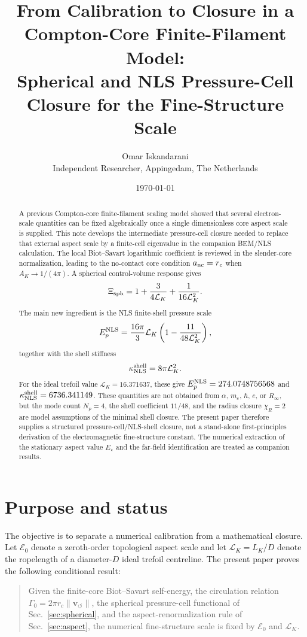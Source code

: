 \documentclass[11pt]{article}
\title{From Calibration to Closure in a Compton-Core Finite-Filament Model:\\
Spherical and NLS Pressure-Cell Closure for the Fine-Structure Scale}
\author{Omar Iskandarani\\
\small Independent Researcher, Appingedam, The Netherlands}
\date{\today}
\newcommand{\vnorm}{\lVert\mathbf{v}_{\!\boldsymbol{\circlearrowleft}}\rVert}
\newcommand{\rc}{r_c}
\newcommand{\LK}{\mathcal L_K}
\newcommand{\Ezero}{\mathcal E_0}
\begin{document}
\maketitle

\begin{abstract}
A previous Compton-core finite-filament scaling model showed that several electron-scale
quantities can be fixed algebraically once a single dimensionless core aspect scale is supplied.
This note develops the intermediate pressure-cell closure needed to replace that external
aspect scale by a finite-cell eigenvalue in the companion BEM/NLS calculation.  The local
Biot--Savart logarithmic coefficient is reviewed in the slender-core normalization, leading to
the no-contact core condition \(a_{\rm nc}=r_c\) when \(A_K\to1/(4\pi)\).  A spherical
control-volume response gives
\[
  \Xi_{\rm sph}
  =
  1+\frac{3}{4\mathcal L_K}+\frac{1}{16\mathcal L_K^2}.
\]
The main new ingredient is the NLS finite-shell pressure scale
\[
  E_p^{\rm NLS}
  =
  \frac{16\pi}{3}\mathcal L_K
  \left(1-\frac{11}{48\mathcal L_K^2}\right),
\]
together with the shell stiffness
\[
  \kappa_{\rm NLS}^{\rm shell}=8\pi\mathcal L_K^2.
\]
For the ideal trefoil value \(\mathcal L_K=16.371637\), these give
\(E_p^{\rm NLS}=274.0748756568\) and
\(\kappa_{\rm NLS}^{\rm shell}=6736.341149\).  These quantities are not obtained from
\(\alpha\), \(m_e\), \(\hbar\), \(e\), or \(R_\infty\), but the mode count
\(N_p=4\), the shell coefficient \(11/48\), and the radius closure
\(\chi_R=2\) are model assumptions of the minimal shell closure.  The present
paper therefore supplies a structured pressure-cell/NLS-shell closure, not a
stand-alone first-principles derivation of the electromagnetic fine-structure
constant.  The numerical extraction of the stationary aspect value \(E_\star\)
and the far-field identification are treated as companion results.
\end{abstract}

\section{Purpose and status}

The objective is to separate a numerical calibration from a mathematical closure.  Let
\(\Ezero\) denote a zeroth-order topological aspect scale and let \(\LK=L_K/D\) denote the
ropelength of a diameter-\(D\) ideal trefoil centreline.  The present paper proves the following
conditional result:

\begin{quote}
Given the finite-core Biot--Savart self-energy, the circulation relation
\(\Gamma_0=2\pi \rc\vnorm\), the spherical pressure-cell functional of
Sec.~\ref{sec:spherical}, and the aspect-renormalization rule of Sec.~\ref{sec:aspect},
the numerical fine-structure scale is fixed by \(\Ezero\) and \(\LK\).
\end{quote}
\end{document}
